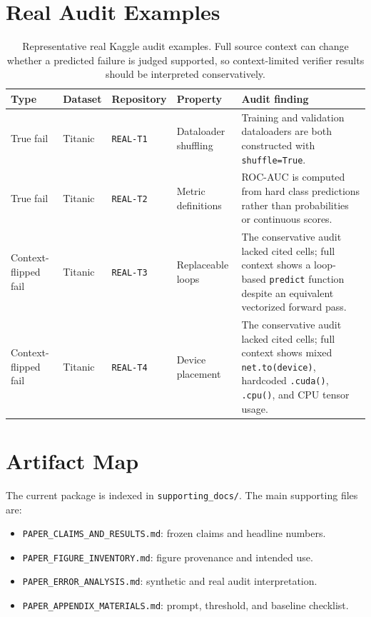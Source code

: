 \documentclass[11pt]{article}
\begin{document}


\appendix

\section{Real Audit Examples}

\begin{table}[t]
  \centering
  \small
  \setlength{\tabcolsep}{4pt}
  \begin{tabularx}{\textwidth}{@{}p{2.0cm}p{1.4cm}p{2.15cm}p{2.25cm}X@{}}
    \toprule
    Type & Dataset & Repository & Property & Audit finding \\
    \midrule
    True fail & Titanic & \texttt{REAL-T1} & Dataloader shuffling &
    Training and validation dataloaders are both constructed with
    \texttt{shuffle=True}. \\
    True fail & Titanic & \texttt{REAL-T2} & Metric definitions &
    ROC-AUC is computed from hard class predictions rather than probabilities
    or continuous scores. \\
    Context-flipped fail & Titanic & \texttt{REAL-T3} & Replaceable loops &
    The conservative audit lacked cited cells; full context shows a loop-based
    \texttt{predict} function despite an equivalent vectorized forward pass. \\
    Context-flipped fail & Titanic & \texttt{REAL-T4} & Device placement &
    The conservative audit lacked cited cells; full context shows mixed
    \texttt{net.to(device)}, hardcoded \texttt{.cuda()}, \texttt{.cpu()}, and
    CPU tensor usage. \\
    \bottomrule
  \end{tabularx}
  \caption{Representative real Kaggle audit examples. Full source context can
  change whether a predicted failure is judged supported, so context-limited
  verifier results should be interpreted conservatively.}
  \label{tab:real-audit-examples}
\end{table}

\section{Artifact Map}

The current package is indexed in \texttt{supporting\_docs/}.
The main supporting files are:
\begin{itemize}
  \item \texttt{PAPER\_CLAIMS\_AND\_RESULTS.md}: frozen claims and headline numbers.
  \item \texttt{PAPER\_FIGURE\_INVENTORY.md}: figure provenance and intended use.
  \item \texttt{PAPER\_ERROR\_ANALYSIS.md}: synthetic and real audit interpretation.
  \item \texttt{PAPER\_APPENDIX\_MATERIALS.md}: prompt, threshold, and baseline checklist.
\end{itemize}
\end{document}

